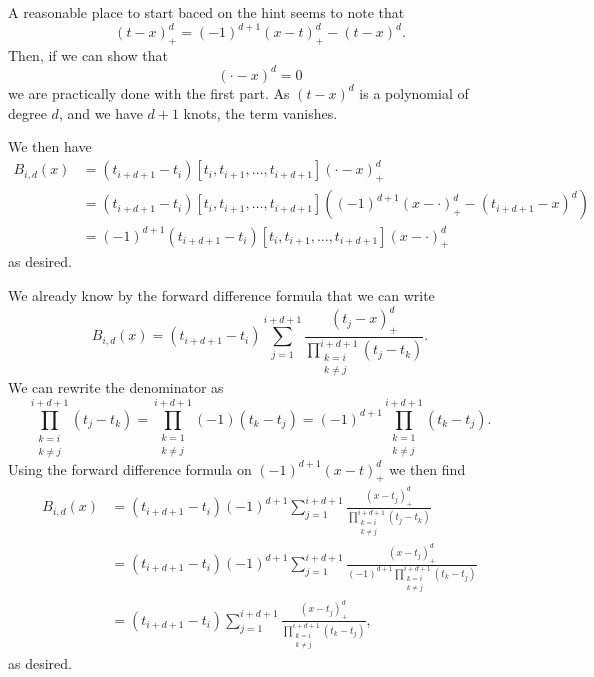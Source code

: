 \begin{solution}
    A reasonable place to start baced on the hint seems to note that
    \begin{equation*}
        (t - x)_+^d = (-1)^{d+1} (x - t)_+^d - (t - x)^d.
    \end{equation*}
    Then, if we can show that
    \begin{equation*}
        [t_i, t_{i+1}, \ldots, t_{i+d+1}] (\cdot - x)^d = 0
    \end{equation*}
    we are practically done with the first part.
    As $(t - x)^d$ is a polynomial of degree $d$, and we have $d + 1$ knots, the term vanishes.

    We then have
    \begin{align*}
        B_{i, d}(x)
        &= (t_{i+d+1} - t_i) [t_i, t_{i+1}, \ldots, t_{i+d+1}] (\cdot - x)_+^{d} \\
        &= (t_{i+d+1} - t_i) [t_i, t_{i+1}, \ldots, t_{i+d+1}] \left(
            (-1)^{d+1}(x - \cdot)_+^{d} - (t_{i+d+1} - x)^d
        \right) \\
        &= (-1)^{d+1} (t_{i+d+1} - t_i) [t_i, t_{i+1}, \ldots, t_{i+d+1}] (x - \cdot)_+^{d}
    \end{align*}
    as desired.

    We already know by the forward difference formula that we can write
    \begin{equation*}
        B_{i, d}(x)
        = (t_{i+d+1} - t_i) \sum_{j = 1}^{i + d + 1} \frac{
            (t_j - x)_+^d
        }{
            \prod_{\substack{k = i \\ k \neq j}}^{i + d + 1} (t_j - t_k)
        }.
    \end{equation*}
    We can rewrite the denominator as
    \begin{equation*}
        \prod_{\substack{k = i \\ k \neq j}}^{i + d + 1} (t_j - t_k)
        = \prod_{\substack{k = 1 \\ k \neq j}}^{i + d + 1} (-1)(t_k - t_j)
        = (-1)^{d+1} \prod_{\substack{k = 1 \\ k \neq j}}^{i + d + 1} (t_k - t_j).
    \end{equation*}
    Using the forward difference formula on $(-1)^{d+1} (x - t)_+^d$ we then find
    \begin{align*}
        B_{i, d}(x)
        &= (t_{i+d+1} - t_i) (-1)^{d+1} \sum_{j = 1}^{i + d + 1} \frac{
            (x - t_j)_+^d
        }{
            \prod_{\substack{k = i \\ k \neq j}}^{i + d + 1} (t_j - t_k)
        } \\
        &= (t_{i+d+1} - t_i) (-1)^{d+1} \sum_{j = 1}^{i + d + 1} \frac{
            (x - t_j)_+^d
        }{
            (-1)^{d+1} \prod_{\substack{k = i \\ k \neq j}}^{i + d + 1} (t_k - t_j)
        } \\
        &= (t_{i+d+1} - t_i) \sum_{j = 1}^{i + d + 1} \frac{
            (x - t_j)_+^d
        }{
            \prod_{\substack{k = i \\ k \neq j}}^{i + d + 1} (t_k - t_j)
        },
    \end{align*}
    as desired.
\end{solution}

